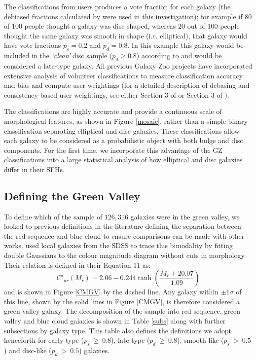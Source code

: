 \documentclass[useAMS,usenatbib]{mn2e}
\def\changed    {\color{titlecol} }
\begin{document}
The classifications from users produces a vote fraction for each galaxy (the debiased fractions calculated by \citet{GZ2} were used in this investigation); for example if 80 of 100 people thought a galaxy was disc shaped, whereas 20 out of 100 people thought the same galaxy was smooth in shape (i.e. elliptical), that galaxy would have vote fractions $p_{s} = 0.2$ and $p_{d} = 0.8$. In this example this galaxy would be included in the \emph{`clean'} disc sample ($p_d \geq 0.8$) according to \cite{GZ2} and would be considered a late-type galaxy. {\changed All previous Galaxy Zoo projects have incorporated extensive analysis of volunteer classifications to measure classification accuracy and bias and compute user weightings (for a detailed description of debasing and consistency-based user weightings, see either Section 3 of \citealt{Lintott09} or Section 3 of \citealt{GZ2}). }

{\changed The classifications are highly accurate and provide a continuous scale of morphological features, as shown in Figure \ref{mosaic}, rather than a simple binary classification separating elliptical and disc galaxies. These classifications allow each galaxy to be considered as a probabilistic object with both bulge and disc components.} For the first time, we incorporate this advantage of the GZ classifications into a large statistical analysis of how elliptical and disc galaxies differ in their SFHs.

\subsection{Defining the Green Valley}\label{defGV}

To define which of the sample of $126, 316$ galaxies were in the green valley, {\changed we looked to previous definitions in the literature defining the separation between the red sequence and blue cloud to ensure comparisons can be made with other works. \citet{Baldry04} used local galaxies from the SDSS to trace this bimodality by fitting double Gaussians to the colour magnitude diagram without cuts in morphology.} Their relation is defined in their Equation 11 as:
\begin{equation}\label{eqgv}
C'_{ur}(M_{r}) = 2.06 - 0.244 \tanh \left( \frac{M_r + 20.07}{1.09}\right)
\end{equation}
and is shown in Figure \ref{CMGV} by the dashed line. Any galaxy within $\pm 1\sigma$ of this line, shown by the solid lines in Figure \ref{CMGV}, is therefore considered a green valley galaxy. The decomposition of the sample into red sequence, green valley and blue cloud galaxies is shown in Table \ref{subs} along with further subsections by galaxy type. This table also defines the definitions we adopt henceforth for early-type ($p_s~ \geq~0.8$), late-type ($p_d~ \geq~0.8$), smooth-like ($p_s~ >~0.5$) and disc-like ($p_d~ >~0.5$) galaxies.
\end{document}
